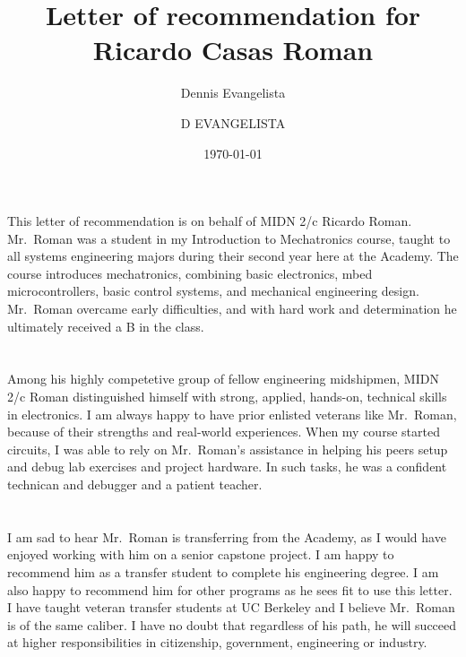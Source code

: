 \documentclass[12pt,courier]{navyletter}
\author{Dennis Evangelista}
\title{Letter of recommendation for Ricardo Casas Roman}
\date{\today}
\begin{document}
\makedateblock{}

\begin{navyletterheader}
\navyskip{}%
\navysubjline{}%
\end{navyletterheader}

\section{}
This letter of recommendation is on behalf of MIDN 2/c Ricardo Roman.  Mr.~Roman was a student in my Introduction to Mechatronics course, taught to all systems engineering majors during their second year here at the Academy. The course introduces mechatronics, combining basic electronics, mbed microcontrollers, basic control systems, and mechanical engineering design.  Mr.~Roman overcame early difficulties, and with hard work and determination he ultimately received a B in the class. 

\section{} 
Among his highly competetive group of fellow engineering midshipmen, MIDN 2/c Roman distinguished himself with strong, applied, hands-on, technical skills in electronics.  I am always happy to have prior enlisted veterans like Mr.~Roman, because of their strengths and real-world experiences.  When my course started circuits, I was able to rely on Mr.~Roman's assistance in helping his peers setup and debug lab exercises and project hardware.  In such tasks, he was a confident technican and debugger and a patient teacher. 

\section{}
I am sad to hear Mr.~Roman is transferring from the Academy, as I would have enjoyed working with him on a senior capstone project.  I am happy to recommend him as a transfer student to complete his engineering degree.  I am also happy to recommend him for other programs as he sees fit to use this letter.  I have taught veteran transfer students at UC Berkeley and I believe Mr.~Roman is of the same caliber. I have no doubt that regardless of his path, he will succeed at higher responsibilities in citizenship, government, engineering or industry.

\noclosing{}\\
\noindent\hspace*{4in}
\signature{D EVANGELISTA}

\end{document}
